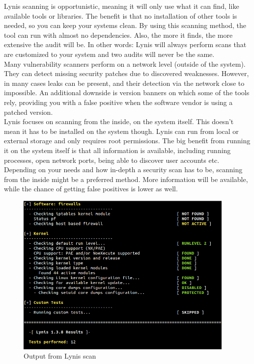 Lynis scanning is opportunistic, meaning it will only use what it can find, like available tools or libraries. The benefit is that no installation of other tools is needed, so you can keep your systems clean.
By using this scanning method, the tool can run with almost no dependencies. Also, the more it finds, the more extensive the audit will be. In other words: Lynis will always perform scans that are customized to your system and two audits will never be the same.
\\

Many vulnerability scanners perform on a network level (outside of the system). They can detect missing security patches due to discovered weaknesses. However, in many cases leaks can be present, and their detection via the network close to impossible. An additional downside is version banners on which some of the tools rely, providing you with a false positive when the software vendor is using a patched version.
\\

Lynis focuses on scanning from the inside, on the system itself. This doesn’t mean it has to be installed on the system though. Lynis can run from local or external storage and only requires root permissions. The big benefit from running it on the system itself is that all information is available, including running processes, open network ports, being able to discover user accounts etc. Depending on your needs and how in-depth a security scan has to be, scanning from the inside might be a preferred method. More information will be available, while the chance of getting false positives is lower as well.

\begin{figure}[!h]
  \centering
  \includegraphics[width=0.95\textwidth]{images/lynis-example.png}
  \caption{Output from Lynis scan}
  \label{Lynis}
\end{figure}

